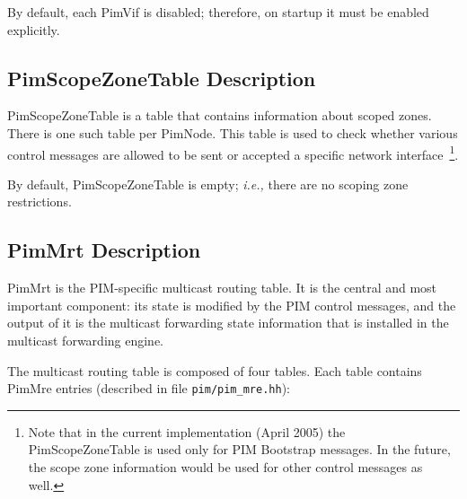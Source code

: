 \documentclass[11pt]{article}
\newcommand{\ie}{\emph{i.e.,}\xspace}
\begin{document}
By default, each PimVif is disabled; therefore, on startup it must be
enabled explicitly. 


\subsection{PimScopeZoneTable Description}

PimScopeZoneTable is a table that contains information about scoped
zones. There is one such table per PimNode. This table is used to check
whether various control messages are allowed to be sent or accepted a
specific network interface~\footnote{Note that in the current implementation
(April 2005) the PimScopeZoneTable is used only for PIM
Bootstrap messages. In the future, the scope zone information would be
used for other control messages as well.}.

By default, PimScopeZoneTable is empty; \ie there are no scoping zone
restrictions.


\subsection{PimMrt Description}

PimMrt is the PIM-specific multicast routing table. It is the central
and most important component: its state is modified by the PIM control
messages, and the output of it is the multicast forwarding state
information that is installed in the multicast forwarding engine.

The multicast routing table is composed of four tables. Each table
contains PimMre entries (described in file \verb=pim/pim_mre.hh=):
\end{document}
